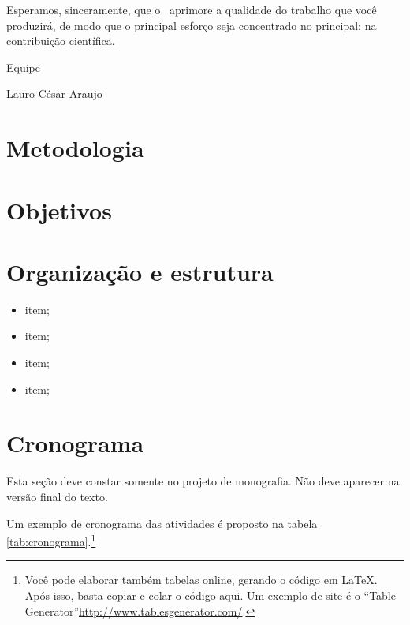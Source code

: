 Esperamos, sinceramente, que o \abnTeX\ aprimore a qualidade do trabalho que
você produzirá, de modo que o principal esforço seja concentrado no principal:
na contribuição científica.

Equipe \abnTeX 

Lauro César Araujo
%
\section{Metodologia}

\lipsum[1]

\section{Objetivos}

\lipsum[7]

\lipsum[8]

\section{Organiza{\c c}{\~a}o e estrutura}

\lipsum*[9-11]

\begin{itemize}
\item item;
\item item;
\item item;
\item item;
\end{itemize}

\section{Cronograma}

Esta seção deve constar somente no projeto de monografia. Não deve aparecer na versão final do texto.



Um exemplo de cronograma das atividades é proposto na tabela \ref{tab:cronograma}.\footnote{Voc{\^e} pode elaborar também tabelas online, gerando o código em \LaTeX. Após isso, basta copiar e colar o código aqui. Um exemplo de site é o ``Table Generator''\url{http://www.tablesgenerator.com/}.}
  
